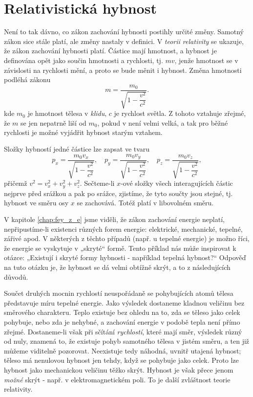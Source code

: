 {{  \section{Relativistická hybnost}
    Není to tak dávno, co zákon zachování hybnosti postihly určité změny. Samotný zákon sice stále 
    platí, ale změny nastaly v definici. V \emph{teorii relativity} se ukazuje, že zákon zachování 
    hybnosti platí. Částice mají hmotnost, a hybnost je definována opět jako součin hmotnosti a 
    rychlosti, tj. \(mv\), jenže hmotnost se v závislosti na rychlosti mění, a proto se bude měnit 
    i hybnost. Změna hmotnosti podléhá zákonu
    \begin{equation}\label{FYZ:eq143}
      m = \dfrac{m_0}{\sqrt{1 - \dfrac{v^2}{c^2}}}.
    \end{equation}
    kde \(m_0\) je hmotnost tělesa v \emph{klidu}, \(c\) je rychlost světla. Z tohoto vztahuje 
    zřejmé, že \(m\) se jen nepatrně liší od \(m_0\), pokud v není velmi velká, a tak pro běžné 
    rychlosti je možné vyjádřit hybnost starým vztahem.
    
    Složky hybností jedné částice lze zapsat ve tvaru
    \begin{equation}\label{FYZ:eq144}
      p_x = \dfrac{m_0v_x}{\sqrt{1 - \dfrac{v^2}{c^2}}}, \quad
      p_y = \dfrac{m_0v_y}{\sqrt{1 - \dfrac{v^2}{c^2}}}, \quad
      p_z = \dfrac{m_0v_z}{\sqrt{1 - \dfrac{v^2}{c^2}}},
    \end{equation}
    přičemž \(v^2 = v_x^2 + v_y^2 + v_z^2\). Sečteme-li \(x\)-ové složky všech interagujících 
    částic nejprve před srážkou a pak po srážce, zjistíme, že tyto součty jsou stejné, tj. hybnost 
    ve směru osy \(x\) se zachovává. Totéž platí v libovolném směru.
    
    V kapitole \ref{chap:fey_z_e} jsme viděli, že zákon zachování energie neplatí, nepřipustíme-li 
    existenci různých forem energie: elektrické, mechanické, tepelné, zářivé apod. V některých z 
    těchto případů (např. u tepelné energie) je možno říci, že energie se vyskytuje v „skryté“ 
    formě. Tento příklad nás může inspirovat k otázce: „Existují i skryté formy hybnosti - 
    například tepelná hybnost?“  Odpověď na tuto otázku je, že hybnost se dá velmi obtížně skrýt, a 
    to z následujících důvodů.
    
    Součet druhých mocnin rychlostí neuspořádaně se pohybujících atomů tělesa představuje míru 
    tepelné energie. Jako výsledek dostaneme kladnou veličinu bez směrového charakteru. Teplo 
    existuje bez ohledu na to, zda se těleso jako celek pohybuje, nebo zda je nehybné, a zachování 
    energie v podobě tepla není přímo zřejmé. Dostaneme-li však při sčítání \emph{rychlostí}, které 
    mají směr, výsledek různý od nuly, znamená to, že existuje pohyb samotného tělesa v jistém 
    směru, a ten již můžeme viditelně pozorovat. Neexistuje tedy náhodná, uvnitř utajená hybnost; 
    těleso má nenulovou hybnost jen tehdy, když se pohybuje jako celek. Proto lze hybnost jako 
    mechanickou veličinu těžko skrýt. Hybnost je však přece jenom \emph{možné} skrýt - např. v 
    elektromagnetickém poli. To je další zvláštnost teorie relativity.
    
}}
